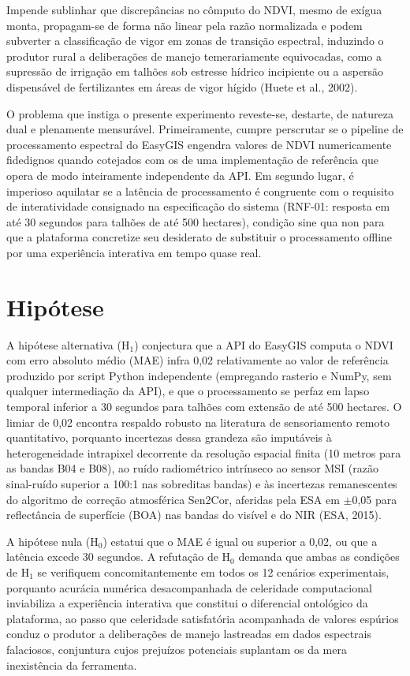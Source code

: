 \documentclass[10pt, a4paper]{article}
\begin{document}
Impende sublinhar que discrepâncias no cômputo do NDVI, mesmo de exígua monta, propagam-se de forma não linear pela razão normalizada e podem subverter a classificação de vigor em zonas de transição espectral, induzindo o produtor rural a deliberações de manejo temerariamente equivocadas, como a supressão de irrigação em talhões sob estresse hídrico incipiente ou a aspersão dispensável de fertilizantes em áreas de vigor hígido (Huete et al., 2002).

O problema que instiga o presente experimento reveste-se, destarte, de natureza dual e plenamente mensurável. Primeiramente, cumpre perscrutar se o pipeline de processamento espectral do EasyGIS engendra valores de NDVI numericamente fidedignos quando cotejados com os de uma implementação de referência que opera de modo inteiramente independente da API. Em segundo lugar, é imperioso aquilatar se a latência de processamento é congruente com o requisito de interatividade consignado na especificação do sistema (RNF-01: resposta em até 30 segundos para talhões de até 500 hectares), condição sine qua non para que a plataforma concretize seu desiderato de substituir o processamento offline por uma experiência interativa em tempo quase real.

\section{Hipótese}

A hipótese alternativa ($\text{H}_1$) conjectura que a API do EasyGIS computa o NDVI com erro absoluto médio (MAE) infra 0,02 relativamente ao valor de referência produzido por script Python independente (empregando rasterio e NumPy, sem qualquer intermediação da API), e que o processamento se perfaz em lapso temporal inferior a 30 segundos para talhões com extensão de até 500 hectares. O limiar de 0,02 encontra respaldo robusto na literatura de sensoriamento remoto quantitativo, porquanto incertezas dessa grandeza são imputáveis à heterogeneidade intrapixel decorrente da resolução espacial finita (10 metros para as bandas B04 e B08), ao ruído radiométrico intrínseco ao sensor MSI (razão sinal-ruído superior a 100:1 nas sobreditas bandas) e às incertezas remanescentes do algoritmo de correção atmosférica Sen2Cor, aferidas pela ESA em $\pm$0,05 para reflectância de superfície (BOA) nas bandas do visível e do NIR (ESA, 2015).

A hipótese nula ($\text{H}_0$) estatui que o MAE é igual ou superior a 0,02, ou que a latência excede 30 segundos. A refutação de $\text{H}_0$ demanda que ambas as condições de $\text{H}_1$ se verifiquem concomitantemente em todos os 12 cenários experimentais, porquanto acurácia numérica desacompanhada de celeridade computacional inviabiliza a experiência interativa que constitui o diferencial ontológico da plataforma, ao passo que celeridade satisfatória acompanhada de valores espúrios conduz o produtor a deliberações de manejo lastreadas em dados espectrais falaciosos, conjuntura cujos prejuízos potenciais suplantam os da mera inexistência da ferramenta.
\end{document}

